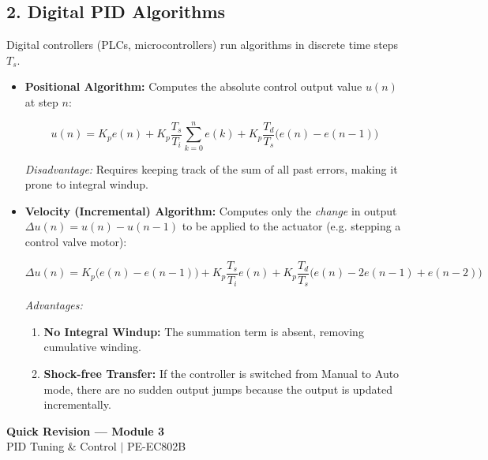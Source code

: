 \documentclass[12pt,a4paper]{article}
\begin{document}
\subsection{2. Digital PID Algorithms}
Digital controllers (PLCs, microcontrollers) run algorithms in discrete time steps $T_s$.

\begin{itemize}[leftmargin=*, itemsep=2.5pt]
  \item \textbf{Positional Algorithm:} Computes the absolute control output value $u(n)$ at step $n$:
  \begin{tcolorbox}[formulabox, title={\textbf{Positional Digital PID}}]
  \[
  u(n) = K_p e(n) + K_p \frac{T_s}{T_i} \sum_{k=0}^n e(k) + K_p \frac{T_d}{T_s} \big( e(n) - e(n-1) \big)
  \]
  \end{tcolorbox}
  \textit{Disadvantage:} Requires keeping track of the sum of all past errors, making it prone to integral windup.
  
  \item \textbf{Velocity (Incremental) Algorithm:} Computes only the \textit{change} in output $\Delta u(n) = u(n) - u(n-1)$ to be applied to the actuator (e.g. stepping a control valve motor):
  \begin{tcolorbox}[formulabox, title={\textbf{Velocity Digital PID}}]
  \[
  \Delta u(n) = K_p \big( e(n) - e(n-1) \big) + K_p \frac{T_s}{T_i} e(n) + K_p \frac{T_d}{T_s} \big( e(n) - 2e(n-1) + e(n-2) \big)
  \]
  \end{tcolorbox}
  \textit{Advantages:}
  \begin{enumerate}[label=\textbf{\arabic*.}, leftmargin=*]
    \item \textbf{No Integral Windup:} The summation term is absent, removing cumulative winding.
    \item \textbf{Shock-free Transfer:} If the controller is switched from Manual to Auto mode, there are no sudden output jumps because the output is updated incrementally.
  \end{enumerate}
\end{itemize}

\newpage

\begin{center}
  {\large\bfseries\color{myred} Quick Revision --- Module 3}\\[3pt]
  {\small\color{mydark} PID Tuning \& Control $|$ PE-EC802B}
\end{center}
\noindent{\color{myred}\rule{\linewidth}{1.2pt}}
\vspace{4pt}
\end{document}
